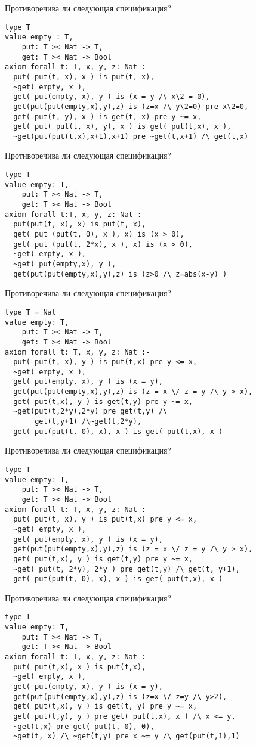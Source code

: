\z Противоречива ли следующая спецификация?
\begin{lstlisting}
type T
value empty : T,
    put: T >< Nat -> T,
    get: T >< Nat -> Bool
axiom forall t: T, x, y, z: Nat :-
  put( put(t, x), x ) is put(t, x),
  ~get( empty, x ),
  get( put(empty, x), y ) is (x = y /\ x\2 = 0),
  get(put(put(empty,x),y),z) is (z=x /\ y\2=0) pre x\2=0,
  get( put(t, y), x ) is get(t, x) pre y ~= x,
  get( put( put(t, x), y), x ) is get( put(t,x), x ),
  ~get(put(put(t,x),x+1),x+1) pre ~get(t,x+1) /\ get(t,x)
\end{lstlisting}

\z Противоречива ли следующая спецификация?
\begin{lstlisting}
type T
value empty: T,
    put: T >< Nat -> T,
    get: T >< Nat -> Bool
axiom forall t:T, x, y, z: Nat :-
  put(put(t, x), x) is put(t, x),
  get( put (put(t, 0), x ), x) is (x > 0),
  get( put (put(t, 2*x), x ), x) is (x > 0),
  ~get( empty, x ),
  ~get( put(empty,x), y ),
  get(put(put(empty,x),y),z) is (z>0 /\ z=abs(x-y) )
\end{lstlisting}

\z Противоречива ли следующая спецификация?
\begin{lstlisting}
type T = Nat
value empty: T,
    put: T >< Nat -> T,
    get: T >< Nat -> Bool
axiom forall t: T, x, y, z: Nat :-
  put( put(t, x), y ) is put(t,x) pre y <= x,
  ~get( empty, x ),
  get( put(empty, x), y ) is (x = y),
  get(put(put(empty,x),y),z) is (z = x \/ z = y /\ y > x),
  get( put(t,x), y ) is get(t,y) pre y ~= x,
  ~get(put(t,2*y),2*y) pre get(t,y) /\
       get(t,y+1) /\~get(t,2*y),
  get( put(put(t, 0), x), x ) is get( put(t,x), x )
\end{lstlisting}

\z Противоречива ли следующая спецификация?
\begin{lstlisting}
type T
value empty: T,
    put: T >< Nat -> T,
    get: T >< Nat -> Bool
axiom forall t: T, x, y, z: Nat :-
  put( put(t, x), y ) is put(t,x) pre y <= x,
  ~get( empty, x ),
  get( put(empty, x), y ) is (x = y),
  get(put(put(empty,x),y),z) is (z = x \/ z = y /\ y > x),
  get( put(t,x), y ) is get(t,y) pre y ~= x,
  ~get( put(t, 2*y), 2*y ) pre get(t,y) /\ get(t, y+1),
  get( put(put(t, 0), x), x ) is get( put(t,x), x )
\end{lstlisting}

\z Противоречива ли следующая спецификация?
\begin{lstlisting}
type T
value empty: T,
    put: T >< Nat -> T,
    get: T >< Nat -> Bool
axiom forall t: T, x, y, z: Nat :-
  put( put(t,x), x ) is put(t,x),
  ~get( empty, x ),
  get( put(empty, x), y ) is (x = y),
  get(put(put(empty,x),y),z) is (z=x \/ z=y /\ y>2),
  get( put(t,x), y ) is get(t, y) pre y ~= x,
  get( put(t,y), y ) pre get( put(t,x), x ) /\ x <= y,
  ~get(t,x) pre get( put(t, 0), 0),
  ~get(t, x) /\ ~get(t,y) pre x ~= y /\ get(put(t,1),1)
\end{lstlisting}

